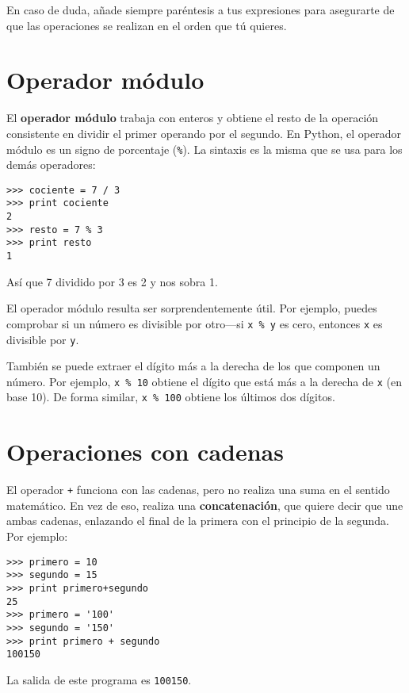En caso de duda, añade siempre paréntesis a tus expresiones para asegurarte
de que las operaciones se realizan en el orden que tú quieres.

\section{Operador módulo}


El {\bf operador módulo} trabaja con enteros y obtiene el resto
de la operación consistente en dividir el primer operando por el segundo. En Python, el
operador módulo es un signo de porcentaje (\verb"%"). La sintaxis es la misma
que se usa para los demás operadores:

\beforeverb
\begin{verbatim}
>>> cociente = 7 / 3
>>> print cociente
2
>>> resto = 7 % 3
>>> print resto
1
\end{verbatim}
\afterverb
%
Así que 7 dividido por 3 es 2 y nos sobra 1. 

El operador módulo resulta ser sorprendentemente útil. Por ejemplo,
puedes comprobar si un número es divisible por otro---si
{\tt x \% y} es cero, entonces {\tt x} es divisible por {\tt y}.


También se puede extraer el dígito más a la derecha
de los que componen un número. Por ejemplo, {\tt x \% 10} obtiene el
dígito que está más a la derecha de {\tt x} (en base 10). De forma similar, {\tt x \% 100}
obtiene los últimos dos dígitos.

\section{Operaciones con cadenas}

El operador {\tt +} funciona con las cadenas, pero
no realiza una suma en el sentido matemático. En vez de eso, realiza una
{\bf concatenación}, que quiere decir que une ambas cadenas,
enlazando el final de la primera con el principio de la segunda. Por ejemplo:


\beforeverb
\begin{verbatim}
>>> primero = 10
>>> segundo = 15
>>> print primero+segundo
25
>>> primero = '100'
>>> segundo = '150'
>>> print primero + segundo
100150
\end{verbatim}
\afterverb
%
La salida de este programa es {\tt 100150}.


